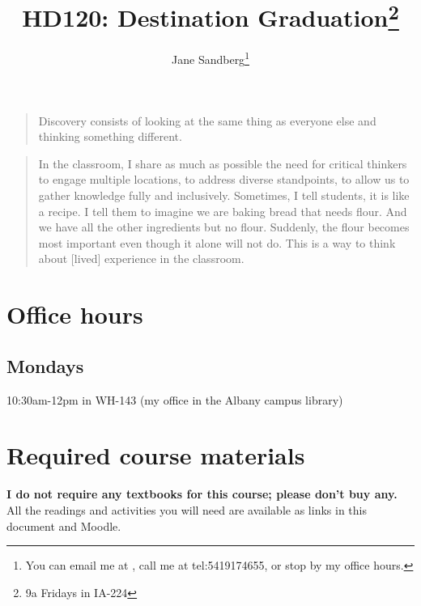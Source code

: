 \documentclass[12pt,article,oneside]{memoir}
\author{Jane Sandberg\thanks{You can email me at \htmladdnormallink{sandbej at linnbenton dot edu}{mailto:sandbej@linnbenton.edu}, call me at \htmladdnormallink{(541) 917 4655}	{tel:5419174655}, or stop by my office hours.}}
\title{HD120: Destination Graduation\thanks{9a Fridays in IA-224}}
\begin{document}
\renewcommand{\labelitemi}{$\triangleright$}
\setcounter{secnumdepth}{0}
\tightlists


\maketitle


\begin{quotation}
Discovery consists of looking at the same thing as everyone else and thinking something different.

\end{quotation}

\begin{quotation}
In the classroom, I share as much as possible the need for critical thinkers to engage multiple locations, to address diverse standpoints, to allow us to gather knowledge fully and inclusively.  Sometimes, I tell students, it is like a recipe.  I tell them to imagine we are baking bread that needs flour.  And we have all the other ingredients but no flour.  Suddenly, the flour becomes most important even though it alone will not do.  This is a way to think about [lived] experience in the classroom.

\end{quotation}

\begin{htmlonly}
\tableofcontents
\end{htmlonly}
\newpage
\section{Office hours}

\subsection{Mondays}
10:30am-12pm in WH-143 (my office in the Albany campus library)

\section{Required course materials}
\textbf{I do not require any textbooks for this course; please don't buy any.}  All the readings and activities you will need are available as links in this document and Moodle.
\end{document}
